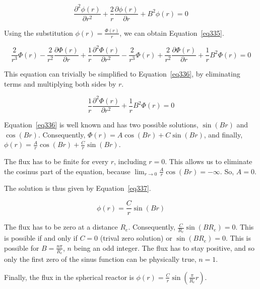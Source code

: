 \begin{equation}\label{eq334}
\frac{\partial^2 \phi(r)}{\partial r^2} + \frac{2}{r}\frac{\partial \phi(r)}{\partial r} + B^2\phi(r) = 0
\end{equation}

Using the substitution $\phi(r) = \frac{\Phi(r)}{r}$, we can obtain Equation~\ref{eq335}.

\begin{equation}\label{eq335}
\frac{2}{r^3}\Phi(r) - \frac{2}{r^2}\frac{\partial \Phi(r)}{\partial r} + \frac{1}{r}\frac{\partial^2 \Phi(r)}{\partial r^2} - \frac{2}{r^3}\Phi(r) + \frac{2}{r^2}\frac{\partial \Phi(r)}{\partial r} + \frac{1}{r}B^2\Phi(r) = 0
\end{equation}

This equation can trivially be simplified to Equation~\ref{eq336}, by eliminating terms and multiplying both sides by $r$.

\begin{equation}\label{eq336}
\frac{1}{r}\frac{\partial^2 \Phi(r)}{\partial r^2} + \frac{1}{r}B^2\Phi(r) = 0
\end{equation}

Equation~\ref{eq336} is well known and has two possible solutions, $\sin(Br)$ and $\cos(Br)$. Consequently, $\Phi(r) = A\cos(Br) + C\sin(Br)$, and finally, $\phi(r) = \frac{A}{r}\cos(Br) + \frac{C}{r}\sin(Br)$.

The flux has to be finite for every $r$, including $r=0$. This allows us to eliminate the cosinus part of the equation, because $\lim_{r\to 0} \frac{A}{r}\cos(Br) = - \infty$. So, $A = 0$.

The solution is thus given by Equation~\ref{eq337}.

\begin{equation}\label{eq337}
\phi(r) = \frac{C}{r}\sin(Br)
\end{equation}

The flux has to be zero at a distance $R_e$. Consequently, $\frac{C}{R_e}\sin(BR_e) = 0$. This is possible if and only if $C = 0$ (trival zero solution) or $\sin(BR_e) = 0$. This is possible for $B = \frac{n\pi}{R_e}$, $n$ being an odd integer. The flux has to stay positive, and so only the first zero of the sinus function can be physically true, $n = 1$.

Finally, the flux in the spherical reactor is $\phi(r) = \frac{C}{r}\sin(\frac{\pi}{R_e}r)$.
